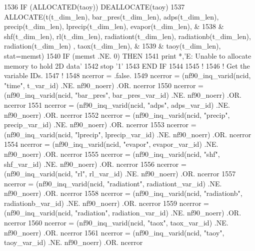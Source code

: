 \begin{DoxyCode}
1536     \textcolor{keywordflow}{IF} (\textcolor{keyword}{ALLOCATED}(taoy))        \textcolor{keyword}{DEALLOCATE}(taoy)
1537     \textcolor{keyword}{ALLOCATE}(t(t\_dim\_len), bar\_pres(t\_dim\_len), adps(t\_dim\_len), precip(t\_dim\_len), lprecip(t\_dim\_len), 
      evapor(t\_dim\_len), &
1538         & shf(t\_dim\_len), rl(t\_dim\_len), radiationt(t\_dim\_len), radiationb(t\_dim\_len), radiation(t\_dim\_len)
      , taox(t\_dim\_len), &
1539         & taoy(t\_dim\_len), stat=memst)
1540     \textcolor{keywordflow}{IF} (memst .NE. 0) \textcolor{keywordflow}{THEN}
1541         print *,\textcolor{stringliteral}{'E: Unable to allocate memory to hold 2D data'}
1542         stop \textcolor{stringliteral}{'1'}
1543 \textcolor{keywordflow}{    END IF}
1544 
1545     \textcolor{comment}{!}
1546     \textcolor{comment}{! Get the variable IDs.}
1547     \textcolor{comment}{!}
1548     ncerror = .false.
1549     ncerror = (nf90\_inq\_varid(ncid, \textcolor{stringliteral}{"time"}, t\_var\_id)                   .NE. nf90\_noerr) .OR. ncerror
1550     ncerror = (nf90\_inq\_varid(ncid, \textcolor{stringliteral}{"bar\_pres"}, bar\_pres\_var\_id)        .NE. nf90\_noerr) .OR. ncerror
1551     ncerror = (nf90\_inq\_varid(ncid, \textcolor{stringliteral}{"adps"}, adps\_var\_id)                .NE. nf90\_noerr) .OR. ncerror
1552     ncerror = (nf90\_inq\_varid(ncid, \textcolor{stringliteral}{"precip"}, precip\_var\_id)            .NE. nf90\_noerr) .OR. ncerror
1553     ncerror = (nf90\_inq\_varid(ncid, \textcolor{stringliteral}{"lprecip"}, lprecip\_var\_id)          .NE. nf90\_noerr) .OR. ncerror
1554     ncerror = (nf90\_inq\_varid(ncid, \textcolor{stringliteral}{"evapor"}, evapor\_var\_id)            .NE. nf90\_noerr) .OR. ncerror
1555     ncerror = (nf90\_inq\_varid(ncid, \textcolor{stringliteral}{"shf"}, shf\_var\_id)                  .NE. nf90\_noerr) .OR. ncerror
1556     ncerror = (nf90\_inq\_varid(ncid, \textcolor{stringliteral}{"rl"}, rl\_var\_id)                    .NE. nf90\_noerr) .OR. ncerror
1557     ncerror = (nf90\_inq\_varid(ncid, \textcolor{stringliteral}{"radiationt"}, radiationt\_var\_id)    .NE. nf90\_noerr) .OR. ncerror
1558     ncerror = (nf90\_inq\_varid(ncid, \textcolor{stringliteral}{"radiationb"}, radiationb\_var\_id)    .NE. nf90\_noerr) .OR. ncerror
1559     ncerror = (nf90\_inq\_varid(ncid, \textcolor{stringliteral}{"radiation"}, radiation\_var\_id)      .NE. nf90\_noerr) .OR. ncerror
1560     ncerror = (nf90\_inq\_varid(ncid, \textcolor{stringliteral}{"taox"}, taox\_var\_id)                .NE. nf90\_noerr) .OR. ncerror
1561     ncerror = (nf90\_inq\_varid(ncid, \textcolor{stringliteral}{"taoy"}, taoy\_var\_id)                .NE. nf90\_noerr) .OR. ncerror

\end{DoxyCode}
